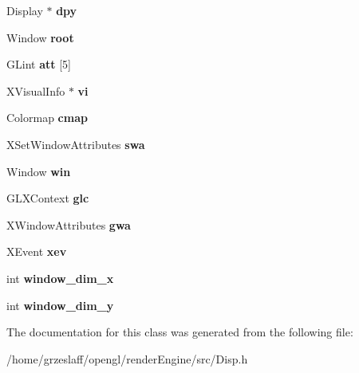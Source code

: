 \begin{DoxyCompactItemize}
\item 
\hypertarget{classDisp_af7bcab6baee1d4564e4777dd694efc5a}{Display $\ast$ {\bfseries dpy}}\label{classDisp_af7bcab6baee1d4564e4777dd694efc5a}

\item 
\hypertarget{classDisp_ac8d4f1c40f3114e5b7c26b53b9d7bbd3}{Window {\bfseries root}}\label{classDisp_ac8d4f1c40f3114e5b7c26b53b9d7bbd3}

\item 
\hypertarget{classDisp_ab2259097095b00aa0a4b5f7861acc0fb}{G\-Lint {\bfseries att} \mbox{[}5\mbox{]}}\label{classDisp_ab2259097095b00aa0a4b5f7861acc0fb}

\item 
\hypertarget{classDisp_a65fe65c3fbefd46ebc6b8fb1155ae31b}{X\-Visual\-Info $\ast$ {\bfseries vi}}\label{classDisp_a65fe65c3fbefd46ebc6b8fb1155ae31b}

\item 
\hypertarget{classDisp_a3802f4403f6543c68cdaf0e61bb38aa5}{Colormap {\bfseries cmap}}\label{classDisp_a3802f4403f6543c68cdaf0e61bb38aa5}

\item 
\hypertarget{classDisp_a971ac1de3380701be458b8fbd99cf0a3}{X\-Set\-Window\-Attributes {\bfseries swa}}\label{classDisp_a971ac1de3380701be458b8fbd99cf0a3}

\item 
\hypertarget{classDisp_a3980527d9b8def51dd2b2eed07c7abf6}{Window {\bfseries win}}\label{classDisp_a3980527d9b8def51dd2b2eed07c7abf6}

\item 
\hypertarget{classDisp_a7eb66fdcf18ba694e900607dab10de9c}{G\-L\-X\-Context {\bfseries glc}}\label{classDisp_a7eb66fdcf18ba694e900607dab10de9c}

\item 
\hypertarget{classDisp_a6428c4fdb0f5916a54bd7173f962d66b}{X\-Window\-Attributes {\bfseries gwa}}\label{classDisp_a6428c4fdb0f5916a54bd7173f962d66b}

\item 
\hypertarget{classDisp_ada828c06cb646bc45361152b41afc5e9}{X\-Event {\bfseries xev}}\label{classDisp_ada828c06cb646bc45361152b41afc5e9}

\item 
\hypertarget{classDisp_a402abb09c7056813c4460d6633ee5f18}{int {\bfseries window\-\_\-dim\-\_\-x}}\label{classDisp_a402abb09c7056813c4460d6633ee5f18}

\item 
\hypertarget{classDisp_a8a8de6f4b6cde5414bc1b51fddafe3ff}{int {\bfseries window\-\_\-dim\-\_\-y}}\label{classDisp_a8a8de6f4b6cde5414bc1b51fddafe3ff}

\end{DoxyCompactItemize}


The documentation for this class was generated from the following file\-:\begin{DoxyCompactItemize}
\item 
/home/grzeslaff/opengl/render\-Engine/src/Disp.\-h\end{DoxyCompactItemize}
